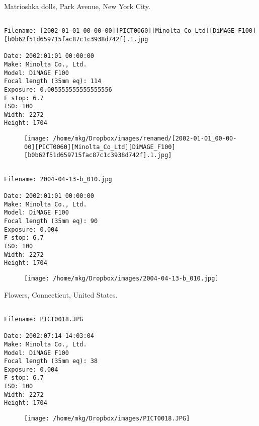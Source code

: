 \clearpage
\onecolumn
\noindent Matrioshka dolls, Park Avenue, New York City.
\noindent
\begin{lstlisting}

Filename: [2002-01-01_00-00-00][PICT0060][Minolta_Co_Ltd][DiMAGE_F100][b0b62f51d659715fac87c1c3938d742f].1.jpg

Date: 2002:01:01 00:00:00
Make: Minolta Co., Ltd.
Model: DiMAGE F100
Focal length (35mm eq): 114
Exposure: 0.005555555555555556
F stop: 6.7
ISO: 100
Width: 2272
Height: 1704
\end{lstlisting}
\clearpage

\begin{figure}
\texttt{[image: /home/mkg/Dropbox/images/renamed/[2002-01-01\_00-00-00][PICT0060][Minolta\_Co\_Ltd][DiMAGE\_F100][b0b62f51d659715fac87c1c3938d742f].1.jpg]}
\end{figure}
    
\clearpage
\onecolumn
\noindent 
\noindent
\begin{lstlisting}

Filename: 2004-04-13-b_010.jpg

Date: 2002:01:01 00:00:00
Make: Minolta Co., Ltd.
Model: DiMAGE F100
Focal length (35mm eq): 90
Exposure: 0.004
F stop: 6.7
ISO: 100
Width: 2272
Height: 1704
\end{lstlisting}
\clearpage

\begin{figure}
\texttt{[image: /home/mkg/Dropbox/images/2004-04-13-b\_010.jpg]}
\end{figure}
    
\clearpage
\onecolumn
\noindent Flowers, Connecticut, United States.
\noindent
\begin{lstlisting}

Filename: PICT0018.JPG

Date: 2002:07:14 14:03:04
Make: Minolta Co., Ltd.
Model: DiMAGE F100
Focal length (35mm eq): 38
Exposure: 0.004
F stop: 6.7
ISO: 100
Width: 2272
Height: 1704
\end{lstlisting}
\clearpage

\begin{figure}
\texttt{[image: /home/mkg/Dropbox/images/PICT0018.JPG]}
\end{figure}
    
